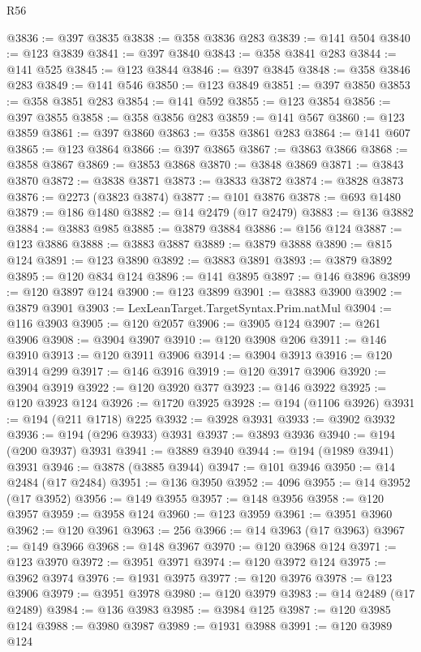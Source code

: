 \begin{lexlean}{R56}
\begin{coremodule}
@3836 := @397 @3835
@3838 := @358 @3836 @283
@3839 := @141 @504
@3840 := @123 @3839
@3841 := @397 @3840
@3843 := @358 @3841 @283
@3844 := @141 @525
@3845 := @123 @3844
@3846 := @397 @3845
@3848 := @358 @3846 @283
@3849 := @141 @546
@3850 := @123 @3849
@3851 := @397 @3850
@3853 := @358 @3851 @283
@3854 := @141 @592
@3855 := @123 @3854
@3856 := @397 @3855
@3858 := @358 @3856 @283
@3859 := @141 @567
@3860 := @123 @3859
@3861 := @397 @3860
@3863 := @358 @3861 @283
@3864 := @141 @607
@3865 := @123 @3864
@3866 := @397 @3865
@3867 := @3863 @3866
@3868 := @3858 @3867
@3869 := @3853 @3868
@3870 := @3848 @3869
@3871 := @3843 @3870
@3872 := @3838 @3871
@3873 := @3833 @3872
@3874 := @3828 @3873
@3876 := @2273 (@3823 @3874)
@3877 := @101 @3876
@3878 := @693 @1480
@3879 := @186 @1480
@3882 := @14 @2479 (@17 @2479)
@3883 := @136 @3882
@3884 := @3883 @985
@3885 := @3879 @3884
@3886 := @156 @124
@3887 := @123 @3886
@3888 := @3883 @3887
@3889 := @3879 @3888
@3890 := @815 @124
@3891 := @123 @3890
@3892 := @3883 @3891
@3893 := @3879 @3892
@3895 := @120 @834 @124
@3896 := @141 @3895
@3897 := @146 @3896
@3899 := @120 @3897 @124
@3900 := @123 @3899
@3901 := @3883 @3900
@3902 := @3879 @3901
@3903 := LexLeanTarget.TargetSyntax.Prim.natMul
@3904 := @116 @3903
@3905 := @120 @2057
@3906 := @3905 @124
@3907 := @261 @3906
@3908 := @3904 @3907
@3910 := @120 @3908 @206
@3911 := @146 @3910
@3913 := @120 @3911 @3906
@3914 := @3904 @3913
@3916 := @120 @3914 @299
@3917 := @146 @3916
@3919 := @120 @3917 @3906
@3920 := @3904 @3919
@3922 := @120 @3920 @377
@3923 := @146 @3922
@3925 := @120 @3923 @124
@3926 := @1720 @3925
@3928 := @194 (@1106 @3926)
@3931 := @194 (@211 @1718) @225
@3932 := @3928 @3931
@3933 := @3902 @3932
@3936 := @194 (@296 @3933) @3931
@3937 := @3893 @3936
@3940 := @194 (@200 @3937) @3931
@3941 := @3889 @3940
@3944 := @194 (@1989 @3941) @3931
@3946 := @3878 (@3885 @3944)
@3947 := @101 @3946
@3950 := @14 @2484 (@17 @2484)
@3951 := @136 @3950
@3952 := 4096
@3955 := @14 @3952 (@17 @3952)
@3956 := @149 @3955
@3957 := @148 @3956
@3958 := @120 @3957
@3959 := @3958 @124
@3960 := @123 @3959
@3961 := @3951 @3960
@3962 := @120 @3961
@3963 := 256
@3966 := @14 @3963 (@17 @3963)
@3967 := @149 @3966
@3968 := @148 @3967
@3970 := @120 @3968 @124
@3971 := @123 @3970
@3972 := @3951 @3971
@3974 := @120 @3972 @124
@3975 := @3962 @3974
@3976 := @1931 @3975
@3977 := @120 @3976
@3978 := @123 @3906
@3979 := @3951 @3978
@3980 := @120 @3979
@3983 := @14 @2489 (@17 @2489)
@3984 := @136 @3983
@3985 := @3984 @125
@3987 := @120 @3985 @124
@3988 := @3980 @3987
@3989 := @1931 @3988
@3991 := @120 @3989 @124

\end{coremodule}
\end{lexlean}

